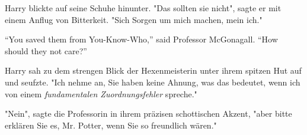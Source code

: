 Harry blickte auf seine Schuhe hinunter. "Das sollten sie nicht", sagte er mit einem Anflug von Bitterkeit. "Sich Sorgen um mich machen, mein ich." 

“You saved them from You-Know-Who,” said Professor McGonagall. “How should they not care?”

Harry sah zu dem strengen Blick der Hexenmeisterin unter ihrem spitzen Hut auf und seufzte. "Ich nehme an, Sie haben keine Ahnung, was das bedeutet, wenn ich von einem \emph{fundamentalen Zuordnungsfehler} spreche." 

"Nein", sagte die Professorin in ihrem präzisen schottischen Akzent, "aber bitte erklären Sie es, Mr. Potter, wenn Sie so freundlich wären." 

